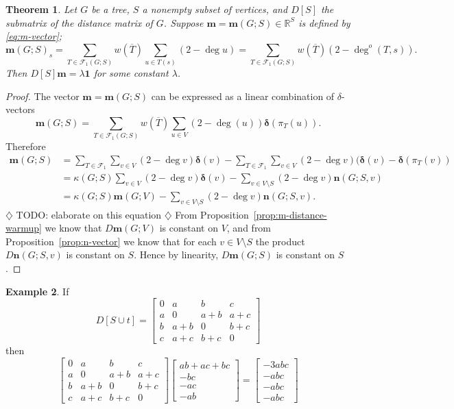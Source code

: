 \documentclass{amsart}
\newtheorem{thm}{Theorem}
\theoremstyle{definition}
\newtheorem{eg}[thm]{Example}
\newcommand{\RR}{\mathbb{R}}
\newcommand{\bone}{\mathbf{1}}
\newcommand{\bolddelta}{\bm{\delta}}
\newcommand{\boldm}{\mathbf{m}}
\newcommand{\boldn}{\mathbf{n}}
\newcommand{\trees}{\mathcal{F}_1}
\newcommand{\degout}{\deg^o}
\newcommand{\note}[1]{{\color{red} \sf $\diamondsuit$  {#1} $\diamondsuit$ }}
\begin{document}
\begin{thm}
Let $G$ be a tree, $S$ a nonempty subset of vertices,
and $D[S]$ the submatrix of the distance matrix of $G$.
Suppose $\boldm = \boldm(G;S) \in \RR^{S}$ is defined by \eqref{eq:m-vector};
\begin{equation}
	\boldm(G;S)_s = \sum_{T \in \trees(G;S)} w(\overline{T}) \sum_{u \in T(s)} (2 - \deg u) 
	= \sum_{T \in \trees(G;S)} w(\overline{T}) (2 - \degout(T,s)) .
\end{equation}
Then $D[S] \boldm = \lambda \bone$
for some constant $\lambda$.
\end{thm}
\begin{proof}
The vector $\boldm = \boldm(G;S)$ can be expressed as a linear combination of $\delta$-vectors
\[
	\boldm(G; S) = \sum_{T \in \trees(G; S)} w(\overline{T}) \sum_{u \in V} (2 - \deg(u)) \bolddelta(\pi_T(u)).
\]
Therefore
\begin{align}
	\boldm (G;S)
	&= \sum_{T \in \trees} \sum_{v \in V}(2 - \deg v) {\bolddelta}(v) 
	- \sum_{T \in \trees} \sum_{v \in V} (2 - \deg v) (\bolddelta(v) - \bolddelta(\pi_T(v)) \\
	&= \kappa(G; S) \sum_{v \in V}(2 - \deg v) {\bolddelta}(v) 
	- \sum_{v \in V \setminus S} (2 - \deg v) \mathbf{n}(G;S,v) \\
	&= \kappa(G;S) \boldm(G;V) - \sum_{v\in V\setminus S} (2 - \deg v) \boldn(G;S,v).
\end{align}
\note{TODO: elaborate on this equation}
From Proposition~\ref{prop:m-distance-warmup} we know that $D \boldm(G;V)$ is constant on $V$,
and from Proposition~\ref{prop:n-vector} we know that  for each $v \in V \setminus S$ the product $D \boldn(G;S,v)$ is constant on $S$.
Hence by linearity, $D \boldm(G;S)$ is constant on $S$.
\end{proof}

\begin{eg}
If 
$$
D[S \cup t] = \begin{bmatrix}
0 & a & b & c \\
a & 0 & a + b & a + c \\
b & a + b & 0 & b + c \\
c & a + c & b + c & 0
\end{bmatrix}
$$
then
$$
 \begin{bmatrix}
0 & a & b & c \\
a & 0 & a + b & a + c \\
b & a + b & 0 & b + c \\
c & a + c & b + c & 0
\end{bmatrix}
\begin{bmatrix}
ab + ac + bc \\ -bc \\ -ac \\ -ab 
\end{bmatrix}
= \begin{bmatrix}
-3abc \\ -abc \\ -abc \\ -abc
\end{bmatrix}
$$
\end{eg}
\end{document}
